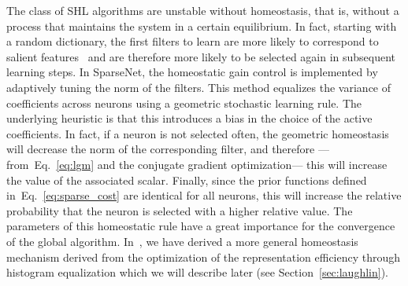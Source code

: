 \documentclass[a4paper, 11pt]{book}
\newcommand{\seeEq}[1]{Eq.~\ref{eq:#1}}%
\begin{document}
The class of SHL algorithms are unstable without homeostasis, that is, without a process that maintains the system in a certain equilibrium. In fact, starting with a random dictionary, the first filters to learn are more likely to correspond to salient features~\citep{Perrinet03ieee} and are therefore more likely to be selected again in subsequent learning steps. In {\sc SparseNet}, the homeostatic gain control is implemented by adaptively tuning the norm of the filters. This method equalizes the variance of coefficients across neurons using a geometric stochastic learning rule. The underlying heuristic is that this introduces a bias in the choice of the active coefficients. In fact, if a neuron is not selected often, the geometric homeostasis will decrease the norm of the corresponding filter, and therefore ---from~\seeEq{lgm} and the conjugate gradient optimization--- this will increase the value of the associated scalar. Finally, since the prior functions defined in~\seeEq{sparse_cost} are identical for all neurons, this will increase the relative probability that the neuron is selected with a higher relative value. The parameters of this homeostatic rule have a great importance for the convergence of the global algorithm. In~\citep{Perrinet10shl}, we have derived a more general homeostasis mechanism derived from the optimization of the representation efficiency through histogram equalization which we will describe later (see Section~\ref{sec:laughlin}).
\end{document}
